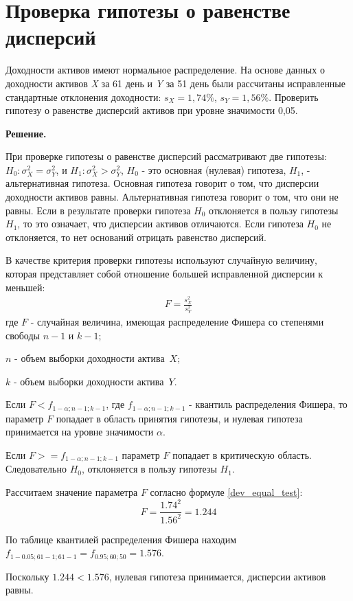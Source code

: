 \documentclass[12pt,a4paper]{article}
\begin{document}
\section{Проверка гипотезы о равенстве дисперсий}
\begin{taskrus}
Доходности активов имеют нормальное распределение. На основе данных о доходности активов \textit{X} за 61 день и \textit{Y} за 51 день были рассчитаны исправленные стандартные отклонения доходности: $s_X=1,74\%$, $s_Y = 1,56\%$. Проверить гипотезу о равенстве дисперсий активов при уровне значимости 0,05.

\textbf{Решение.}

При проверке гипотезы о равенстве дисперсий рассматривают две гипотезы: $H_0: \sigma_X^2=\sigma_Y^2$, и $H_1: \sigma_X^2 > \sigma_Y^2$, $H_0$ - это основная (нулевая) гипотеза, $H_1$, - альтернативная гипотеза. 
Основная гипотеза говорит о том, что дисперсии доходности активов равны. Альтернативная гипотеза говорит о том, что они не равны. Если в результате проверки гипотеза $H_0$ отклоняется в пользу гипотезы $H_1$, то это означает, что дисперсии активов отличаются. Если гипотеза $H_0$ не отклоняется, то нет оснований отрицать равенство дисперсий.

В качестве критерия проверки гипотезы используют случайную величину, которая представляет собой отношение большей исправленной дисперсии к меньшей:
\begin{align}
\label{dev_equal_test}
F=\frac{s_X^2}{s_Y^2}
\end{align}
где
$F$ - случайная величина, имеющая распределение Фишера со степенями свободы $n-1$ и $k-1$;

$n$ - объем выборки доходности актива~$X$;

$k$ - объем выборки доходности актива~$Y$.

Если $F<f_{1-\alpha;n-1;k-1}$, где $f_{1-\alpha;n-1;k-1}$ - квантиль распределения Фишера, то параметр $F$ попадает в область принятия гипотезы, и нулевая гипотеза принимается на уровне значимости $\alpha$.

Если  $F>=f_{1-\alpha;n-1;k-1}$ параметр $F$ попадает в критическую область. Следовательно $H_0$, отклоняется в пользу гипотезы $H_1$.

Рассчитаем значение параметра $F$ согласно формуле \eqref{dev_equal_test}:
$$F=\frac{1.74^2}{1.56^2}=1.244$$

По таблице квантилей распределения Фишера находим $f_{1-0.05;61-1;61-1}=f_{0.95;60;50}=1.576$. 

Поскольку $1.244<1.576$, нулевая гипотеза принимается, дисперсии активов равны.


\end{taskrus}
\end{document}
